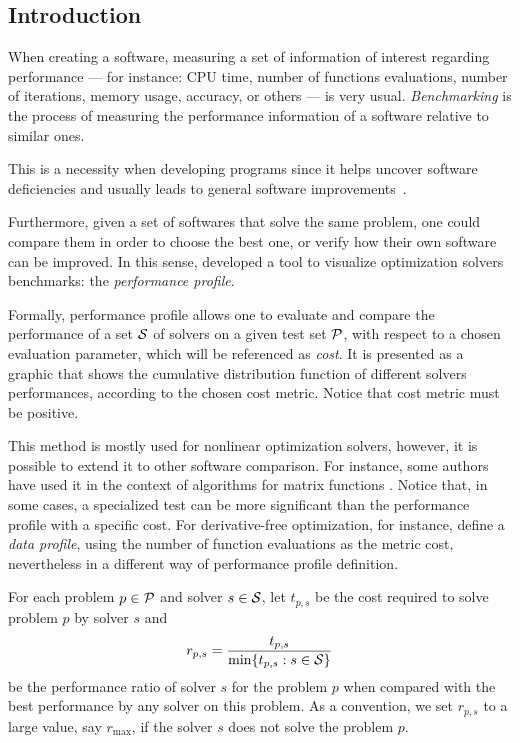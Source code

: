 \subsection*{Introduction}

    When creating a software,  measuring a set of
    information of interest regarding performance
    --- for instance: CPU time, number of
    functions evaluations, number of iterations, memory usage, accuracy, or
    others --- is very usual.   \emph{Benchmarking} is the process of measuring
    the performance  information of a software relative to similar ones.
    
    This is a necessity when developing programs since it
    helps uncover software deficiencies  and usually leads
    to general software improvements~\cite
    {url:mittelmann,Mittelmann:1999fb,Dolan:2006kl}.

    Furthermore, given a set of softwares that solve the same problem, one 
    could compare them in order to choose the best one, or verify how their own
    software can be improved. In this sense, \textcite{Dolan:2002du} developed 
    a tool to visualize optimization solvers benchmarks: the 
    \emph{performance profile}.

    Formally,  performance profile allows one to evaluate and compare the
    performance
    of a set $\mathcal{S}$ of solvers  on a given test set $\mathcal{P}$, with respect
    to a chosen evaluation parameter,
    which will be referenced as \emph{cost}.
    It is presented as
    a graphic that shows the cumulative distribution function of different
    solvers performances, according to the chosen cost metric.
    Notice that cost metric must be positive.

    This  method is mostly used for nonlinear optimization solvers,
    however, it is possible to extend it to other software comparison.
    For instance, some authors have used it in the context of algorithms for
    matrix functions \cite{al-mohy:2009, al-mohy:2011, al-mohy:2012,
    higham:2005, higham:2009, higham:2011, higham:2013}.
    Notice that, in some cases, a
    specialized test can be more significant than the performance profile with
    a specific cost.  For derivative-free optimization, for instance,
    \textcite{More:2009benchmarking} define a \emph{data profile}, using the
    number of function evaluations as the metric cost, nevertheless in a 
    different way of performance profile definition.

    For each
    problem $p \in \mathcal{P}$ and solver $s \in \mathcal{S}$, let $t_{p,s}$ be the
    cost required to solve problem $p$ by solver $s$ and
    \begin{align*}
      r_{p,s} = \frac{t_{p,s}}{\min\{t_{p,s}: s \in \mathcal{S}\}}
    \end{align*}
    be the performance ratio of solver $s$ for the problem $p$ when compared
    with the best performance by any solver on this problem.
    As a convention, we set $r_{p,s}$ to a large value, say $r_{\max}$, if
    the solver $s$ does not solve the problem $p$.

